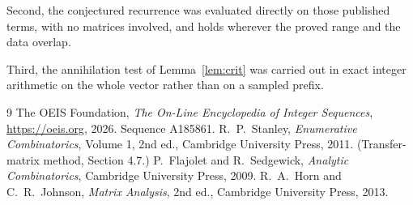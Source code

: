\documentclass[11pt,a4paper]{article}
\theoremstyle{plain}
\theoremstyle{definition}
\begin{document}
Second, the conjectured recurrence was evaluated directly on those published terms, with no
matrices involved, and holds wherever the proved range and the data overlap.

Third, the annihilation test of Lemma~\ref{lem:crit} was carried out in exact integer
arithmetic on the whole vector rather than on a sampled prefix.

\begin{thebibliography}{9}
 The OEIS Foundation, \emph{The On-Line Encyclopedia of Integer
Sequences}, \url{https://oeis.org}, 2026. Sequence A185861.
 R.~P.~Stanley, \emph{Enumerative Combinatorics}, Volume 1, 2nd ed.,
Cambridge University Press, 2011. (Transfer-matrix method, Section 4.7.)
 P.~Flajolet and R.~Sedgewick, \emph{Analytic Combinatorics}, Cambridge
University Press, 2009.
 R.~A.~Horn and C.~R.~Johnson, \emph{Matrix Analysis}, 2nd ed., Cambridge
University Press, 2013.
\end{thebibliography}
\end{document}
